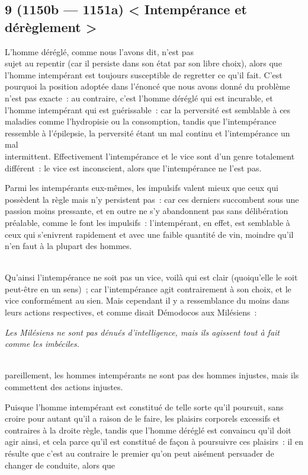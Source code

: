 \documentclass[french,twoside]{book} %
\begin{document}
\subsection[{9 (1150b — 1151a) < Intempérance et dérèglement >}]{9 (1150b — 1151a) < Intempérance et dérèglement >}
\noindent L’homme déréglé, comme nous l’avons dit, n’est pas \\
sujet au repentir (car il persiste dans son état par son libre choix), alors que l’homme intempérant est toujours susceptible de regretter ce qu’il fait. C’est pourquoi la position adoptée dans l’énoncé que nous avons donné du problème n’est pas exacte : au contraire, c’est l’homme déréglé qui est incurable, et l’homme intempérant qui est guérissable : car la perversité est semblable à ces maladies comme l’hydropisie ou la consomption, tandis que l’intempérance ressemble à l’épilepsie, la perversité étant un mal continu et l’intempérance un mal \\
intermittent. Effectivement l’intempérance et le vice sont d’un genre totalement différent : le vice est inconscient, alors que l’intempérance ne l’est pas.\par
 Parmi les intempérants eux-mêmes, les impulsifs valent mieux que ceux qui possèdent la règle mais n’y persistent pas : car ces derniers succombent sous une passion moins pressante, et en outre ne s’y abandonnent pas sans délibération préalable, comme le font les impulsifs : l’intempérant, en effet, est semblable à ceux qui s’enivrent rapidement et avec une faible quantité de vin, moindre qu’il n’en faut à la plupart des hommes.\par
\\
Qu’ainsi l’intempérance ne soit pas un vice, voilà qui est clair (quoiqu’elle le soit peut-être en un sens) ; car l’intempérance agit contrairement à son choix, et le vice conformément au sien. Mais cependant il y a ressemblance du moins dans leurs actions respectives, et comme disait Démodocos aux Milésiens :\par
 {\itshape Les Milésiens ne sont pas dénués d’intelligence, mais ils agissent tout à fait comme les imbéciles.} \par
\\
pareillement, les hommes intempérants ne sont pas des hommes injustes, mais ils commettent des actions injustes.\par
Puisque l’homme intempérant est constitué de telle sorte qu’il poursuit, sans croire pour autant qu’il a raison de le faire, les plaisirs corporels excessifs et contraires à la droite règle, tandis que l’homme déréglé est convaincu qu’il doit agir ainsi, et cela parce qu’il est constitué de façon à poursuivre ces plaisirs : il en résulte que c’est au contraire le premier qu’on peut aisément persuader de changer de conduite, alors que \\
\end{document}
